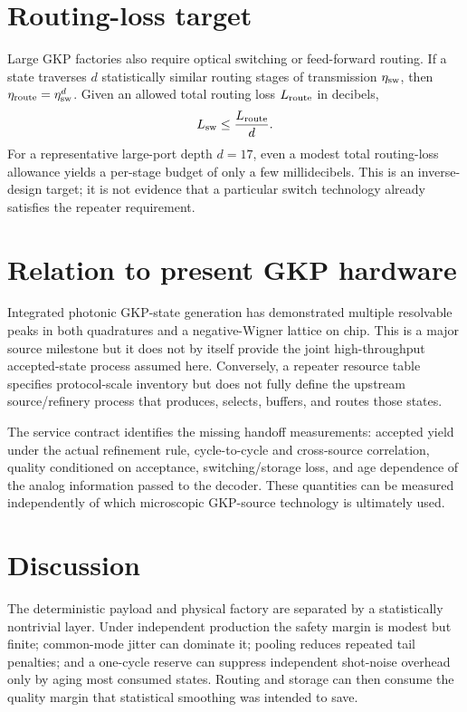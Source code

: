 \documentclass[aps,prx,reprint,superscriptaddress,nofootinbib,longbibliography,floatfix]{revtex4-2}
\begin{document}
\section{Routing-loss target}
Large GKP factories also require optical switching or feed-forward routing. If a state traverses $d$ statistically similar routing stages of transmission $\eta_{\rm sw}$, then $\eta_{\rm route}=\eta_{\rm sw}^d$. Given an allowed total routing loss $L_{\rm route}$ in decibels,
\begin{equation}
L_{\rm sw}\le \frac{L_{\rm route}}{d}.
\end{equation}
For a representative large-port depth $d=17$, even a modest total routing-loss allowance yields a per-stage budget of only a few millidecibels. This is an inverse-design target; it is not evidence that a particular switch technology already satisfies the repeater requirement.

\section{Relation to present GKP hardware}
Integrated photonic GKP-state generation has demonstrated multiple resolvable peaks in both quadratures and a negative-Wigner lattice on chip. This is a major source milestone but it does not by itself provide the joint high-throughput accepted-state process assumed here. Conversely, a repeater resource table specifies protocol-scale inventory but does not fully define the upstream source/refinery process that produces, selects, buffers, and routes those states.

The service contract identifies the missing handoff measurements: accepted yield under the actual refinement rule, cycle-to-cycle and cross-source correlation, quality conditioned on acceptance, switching/storage loss, and age dependence of the analog information passed to the decoder. These quantities can be measured independently of which microscopic GKP-source technology is ultimately used.

\section{Discussion}
The deterministic payload and physical factory are separated by a statistically nontrivial layer. Under independent production the safety margin is modest but finite; common-mode jitter can dominate it; pooling reduces repeated tail penalties; and a one-cycle reserve can suppress independent shot-noise overhead only by aging most consumed states. Routing and storage can then consume the quality margin that statistical smoothing was intended to save.
\end{document}
